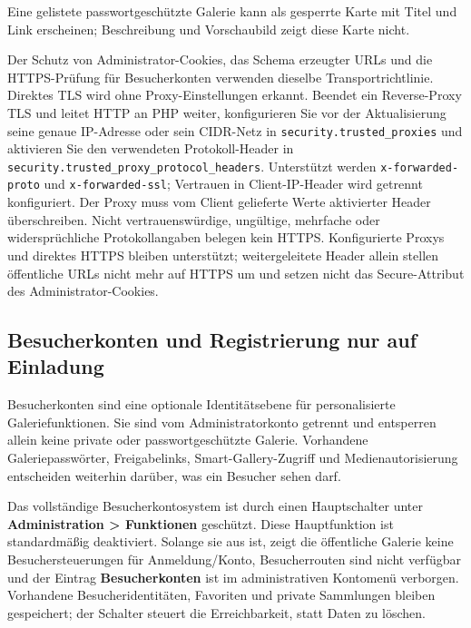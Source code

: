 \documentclass[11pt,a4paper]{article}
\newcommand{\ui}[1]{\textbf{#1}}
\newcommand{\codeword}[1]{\nolinkurl{#1}}
\begin{document}
Eine gelistete passwortgeschützte Galerie kann als gesperrte Karte mit Titel
und Link erscheinen; Beschreibung und Vorschaubild zeigt diese Karte nicht.

Der Schutz von Administrator-Cookies, das Schema erzeugter URLs und die
HTTPS-Prüfung für Besucherkonten verwenden dieselbe Transportrichtlinie.
Direktes TLS wird ohne Proxy-Einstellungen erkannt. Beendet ein Reverse-Proxy
TLS und leitet HTTP an PHP weiter, konfigurieren Sie vor der Aktualisierung
seine genaue IP-Adresse oder sein CIDR-Netz in
\codeword{security.trusted_proxies} und aktivieren Sie den verwendeten
Protokoll-Header in \codeword{security.trusted_proxy_protocol_headers}.
Unterstützt werden \codeword{x-forwarded-proto} und \codeword{x-forwarded-ssl};
Vertrauen in Client-IP-Header wird getrennt konfiguriert. Der Proxy muss vom
Client gelieferte Werte aktivierter Header überschreiben. Nicht
vertrauenswürdige, ungültige, mehrfache oder widersprüchliche Protokollangaben
belegen kein HTTPS. Konfigurierte Proxys und direktes HTTPS bleiben unterstützt;
weitergeleitete Header allein stellen öffentliche URLs nicht mehr auf HTTPS um
und setzen nicht das Secure-Attribut des Administrator-Cookies.

\subsection{Besucherkonten und Registrierung nur auf Einladung}

Besucherkonten sind eine optionale Identitätsebene für personalisierte
Galeriefunktionen. Sie sind vom Administratorkonto getrennt und entsperren
allein keine private oder passwortgeschützte Galerie. Vorhandene
Galeriepasswörter, Freigabelinks, Smart-Gallery-Zugriff und Medienautorisierung
entscheiden weiterhin darüber, was ein Besucher sehen darf.

Das vollständige Besucherkontosystem ist durch einen Hauptschalter unter
\ui{Administration > Funktionen} geschützt. Diese Hauptfunktion ist
standardmäßig deaktiviert. Solange sie aus ist, zeigt die öffentliche Galerie
keine Besuchersteuerungen für Anmeldung/Konto, Besucherrouten sind nicht
verfügbar und der Eintrag \ui{Besucherkonten} ist im administrativen Kontomenü
verborgen. Vorhandene Besucheridentitäten, Favoriten und private Sammlungen
bleiben gespeichert; der Schalter steuert die Erreichbarkeit, statt Daten zu
löschen.
\end{document}
